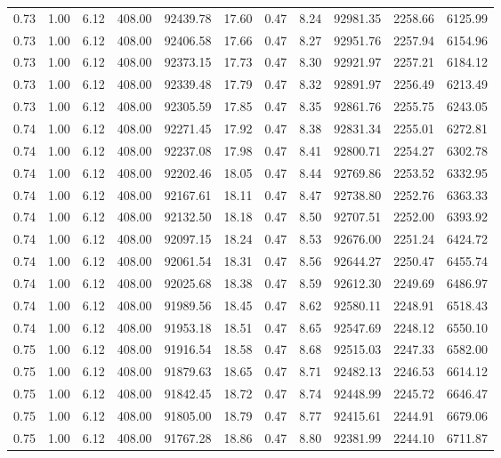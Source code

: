 \begin{table}[!ht]
\begin{tabular}{rrrrrrrrrrr}
0.73 & 1.00 & 6.12 & 408.00 & 92439.78 & 17.60 & 0.47 & 8.24 & 92981.35 & 2258.66 & 6125.99 \\
0.73 & 1.00 & 6.12 & 408.00 & 92406.58 & 17.66 & 0.47 & 8.27 & 92951.76 & 2257.94 & 6154.96 \\
0.73 & 1.00 & 6.12 & 408.00 & 92373.15 & 17.73 & 0.47 & 8.30 & 92921.97 & 2257.21 & 6184.12 \\
0.73 & 1.00 & 6.12 & 408.00 & 92339.48 & 17.79 & 0.47 & 8.32 & 92891.97 & 2256.49 & 6213.49 \\
0.73 & 1.00 & 6.12 & 408.00 & 92305.59 & 17.85 & 0.47 & 8.35 & 92861.76 & 2255.75 & 6243.05 \\
0.74 & 1.00 & 6.12 & 408.00 & 92271.45 & 17.92 & 0.47 & 8.38 & 92831.34 & 2255.01 & 6272.81 \\
0.74 & 1.00 & 6.12 & 408.00 & 92237.08 & 17.98 & 0.47 & 8.41 & 92800.71 & 2254.27 & 6302.78 \\
0.74 & 1.00 & 6.12 & 408.00 & 92202.46 & 18.05 & 0.47 & 8.44 & 92769.86 & 2253.52 & 6332.95 \\
0.74 & 1.00 & 6.12 & 408.00 & 92167.61 & 18.11 & 0.47 & 8.47 & 92738.80 & 2252.76 & 6363.33 \\
0.74 & 1.00 & 6.12 & 408.00 & 92132.50 & 18.18 & 0.47 & 8.50 & 92707.51 & 2252.00 & 6393.92 \\
0.74 & 1.00 & 6.12 & 408.00 & 92097.15 & 18.24 & 0.47 & 8.53 & 92676.00 & 2251.24 & 6424.72 \\
0.74 & 1.00 & 6.12 & 408.00 & 92061.54 & 18.31 & 0.47 & 8.56 & 92644.27 & 2250.47 & 6455.74 \\
0.74 & 1.00 & 6.12 & 408.00 & 92025.68 & 18.38 & 0.47 & 8.59 & 92612.30 & 2249.69 & 6486.97 \\
0.74 & 1.00 & 6.12 & 408.00 & 91989.56 & 18.45 & 0.47 & 8.62 & 92580.11 & 2248.91 & 6518.43 \\
0.74 & 1.00 & 6.12 & 408.00 & 91953.18 & 18.51 & 0.47 & 8.65 & 92547.69 & 2248.12 & 6550.10 \\
0.75 & 1.00 & 6.12 & 408.00 & 91916.54 & 18.58 & 0.47 & 8.68 & 92515.03 & 2247.33 & 6582.00 \\
0.75 & 1.00 & 6.12 & 408.00 & 91879.63 & 18.65 & 0.47 & 8.71 & 92482.13 & 2246.53 & 6614.12 \\
0.75 & 1.00 & 6.12 & 408.00 & 91842.45 & 18.72 & 0.47 & 8.74 & 92448.99 & 2245.72 & 6646.47 \\
0.75 & 1.00 & 6.12 & 408.00 & 91805.00 & 18.79 & 0.47 & 8.77 & 92415.61 & 2244.91 & 6679.06 \\
0.75 & 1.00 & 6.12 & 408.00 & 91767.28 & 18.86 & 0.47 & 8.80 & 92381.99 & 2244.10 & 6711.87 \\

\end{tabular}
\end{table}
